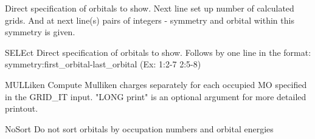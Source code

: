 \begin{keywordlist}
Direct specification of orbitals to show. Next line set up
number of calculated grids. And at next line(s) pairs of integers - symmetry
and orbital within this symmetry is given.
\item[SELEct]
Direct specification of orbitals to show. Follows by one line
in the format: symmetry:first\_orbital-last\_orbital
(Ex: 1:2-7 2:5-8)

\item[MULLiken]
Compute Mulliken charges separately for each occupied MO specified in
the GRID\_IT input. "LONG print" is an optional argument for more
detailed printout.

\item[NoSort]
Do not sort orbitals by occupation numbers and orbital energies


\end{keywordlist}
